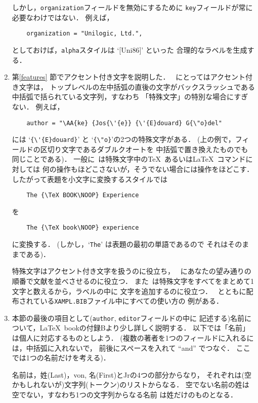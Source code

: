 \begin{enumerate}
しかし，{\tt organization}フィールドを無効にするために
{\tt key}フィールドが常に必要なわけではない．
例えば，
\begin{verbatim}
    organization = "Unilogic, Ltd.",
\end{verbatim}
としておけば，{\tt alpha}スタイルは `\hbox{[Uni86]}' といった
合理的なラベルを生成する．

\item
第\ref{features} 節でアクセント付き文字を説明した．
\BibTeX\ にとってはアクセント付き文字は，
トップレベルの左中括弧の直後の文字がバックスラッシュである
中括弧で括られている文字列，すなわち
「特殊文字」の特別な場合にすぎない．
例えば，
\begin{verbatim}
    author = "\AA{ke} {Jos{\'{e}} {\'{E}douard} G{\"o}del"
\end{verbatim}
には `\verb|{\'{E}douard}|' と `\verb|{\"o}|'の2つの特殊文字がある．
(上の例で，フィールドの区切り文字であるダブルクオートを
中括弧で置き換えたものでも同じことである)．
一般に\BibTeX\ は特殊文字中の\TeX\ あるいは\LaTeX\ コマンドに対しては
何の操作もほどこさないが，そうでない場合には操作を{\dg ほどこす}．
したがって表題を小文字に変換するスタイルでは
\begin{verbatim}
    The {\TeX BOOK\NOOP} Experience
\end{verbatim}
を
\begin{verbatim}
    The {\TeX book\NOOP} experience
\end{verbatim}
に変換する．
(しかし，`{\tt The}' は表題の最初の単語であるので
それはそのままである)．

特殊文字はアクセント付き文字を扱うのに役立ち，
\BibTeX\ にあなたの望み通りの順番で文献を並べさせるのに役立つ．
また\BibTeX\ は特殊文字をすべてをまとめて1文字と数えるから，ラベルの中に
文字を追加するのに役立つ．
\BibTeX\ とともに配布されている{\tt XAMPL.BIB}ファイル中にすべての使い方の
例がある．

\item
本節の最後の項目として({\tt author}, {\tt editor}フィールドの中に
記述する)名前について，\LaTeX\ bookの付録Bより少し詳しく説明する．
以下では「名前」は個人に対応するものとしよう．
(複数の著者を1つのフィールドに入れるには，中括弧に入れないで，
前後にスペースを入れて ``and'' でつなぐ．
ここでは1つの名前だけを考える)．

名前は，姓(Last)，von, 名(First)とJrの4つの部分からなり，
それぞれは(空かもしれないが)文字列(トークン)のリストからなる．
空でない名前の姓は空でない，すなわち1つの文字列からなる名前
は姓だけのものとなる．



\end{enumerate}
